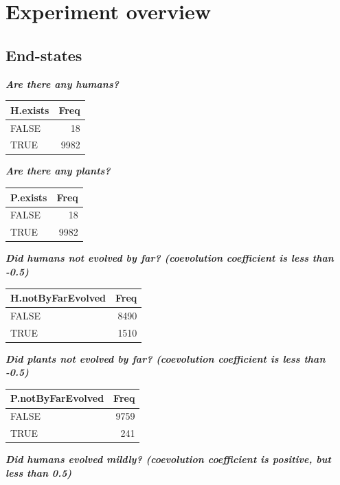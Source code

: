 \documentclass[
]{book}
\begin{document}
\newpage

\hypertarget{experiment-overview}{%
\section{Experiment overview}\label{experiment-overview}}

\hypertarget{end-states-1}{%
\subsection{End-states}\label{end-states-1}}

\textbf{\emph{Are there any humans?}}

\begin{tabular}{l|r}
\hline
H.exists & Freq\\
\hline
FALSE & 18\\
\hline
TRUE & 9982\\
\hline
\end{tabular}

\textbf{\emph{Are there any plants?}}

\begin{tabular}{l|r}
\hline
P.exists & Freq\\
\hline
FALSE & 18\\
\hline
TRUE & 9982\\
\hline
\end{tabular}

\textbf{\emph{Did humans not evolved by far? (coevolution coefficient is less than -0.5)}}

\begin{tabular}{l|r}
\hline
H.notByFarEvolved & Freq\\
\hline
FALSE & 8490\\
\hline
TRUE & 1510\\
\hline
\end{tabular}

\textbf{\emph{Did plants not evolved by far? (coevolution coefficient is less than -0.5)}}

\begin{tabular}{l|r}
\hline
P.notByFarEvolved & Freq\\
\hline
FALSE & 9759\\
\hline
TRUE & 241\\
\hline
\end{tabular}

\textbf{\emph{Did humans evolved mildly? (coevolution coefficient is positive, but less than 0.5)}}
\end{document}
